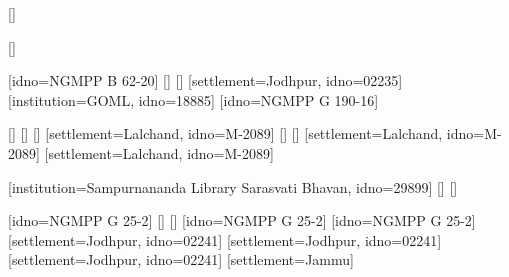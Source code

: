 \usepackage{textgreek}

[] %

[]

[idno=NGMPP B 62-20]
        []
        []
[settlement=Jodhpur, idno=02235]
[institution=GOML, idno=18885]%
[idno=NGMPP G 190-16]

[]
[]
[]
[settlement=Lalchand, idno=M-2089]
        []
        []
[settlement=Lalchand, idno=M-2089]
[settlement=Lalchand, idno=M-2089]

[institution=Sampurnananda Library Sarasvati Bhavan, idno=29899]
[]
[]


[idno=NGMPP G 25-2]
        []
        []
[idno=NGMPP G 25-2]
[idno=NGMPP G 25-2]
[settlement=Jodhpur, idno=02241]
[settlement=Jodhpur, idno=02241]
[settlement=Jodhpur, idno=02241]
[settlement=Jammu]


